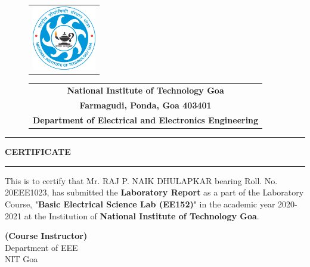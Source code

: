 \thispagestyle{empty}
\begin{figure}
    \begin{minipage}{4cm}
        \begin{tabular}{c}
            \includegraphics[height=2.8cm]{images/NIT_Goa_Logo.png} \\
        \end{tabular}
    \end{minipage}
    \begin{minipage}{7cm}
        \begin{tabular}{c}
            {\huge \textbf{National Institute of Technology Goa}}\vspace{0.5cm}     \\
            {\large \textbf{Farmagudi, Ponda, Goa 403401}}\vspace{0.5cm}            \\
            { \Large \textbf{Department of Electrical and Electronics Engineering}} \\
        \end{tabular}
    \end{minipage}
\end{figure}

\begin{center}
    \vspace{0.5cm}
    {\color{cyan}
        \hrule height 5pt}
    \vspace{0.5cm}
    {\Large \Large \textbf{CERTIFICATE}}
    \vspace{0.5cm}
    {\color{cyan}
        \hrule height 5pt}
\end{center}

\vspace{5cm}

\setlength{\baselineskip}{1.5cm}
{\Large This is to certify that Mr. RAJ P. NAIK DHULAPKAR  bearing Roll. No. 20EEE1023, has submitted the \textbf{Laboratory Report} as a part of the Laboratory Course, "\textbf{Basic Electrical Science Lab (EE152)}" in the academic year 2020-2021 at the Institution of \textbf{National Institute of Technology Goa}.}

\setlength{\baselineskip}{5mm}

\vspace{2cm}

\begin{flushright}
    \vspace{1.3cm}
    {\Large\textbf{(Course Instructor)}\\ Department of EEE\\ NIT Goa}
\end{flushright}

\pagebreak